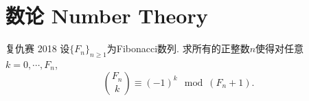 \chapter{数论 Number Theory}

\begin{problem}{复仇赛 2018}
	设$\{ F_n \}_{n \geq 1}$为Fibonacci数列. 求所有的正整数$n$使得对任意$k=0,\cdots ,F_n$, $$\binom{F_n}{k}  \equiv (-1)^k \mod (F_n+1).$$
\end{problem}

